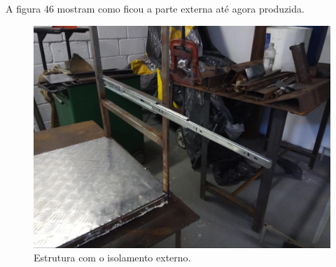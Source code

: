 A figura 46 mostram como ficou a parte externa até agora produzida.

\begin{figure}[H]
	\centering
	\includegraphics[width=12cm]{figuras/resultado_3.jpg}
	\caption{Estrutura com o isolamento externo.} \label{resultado_3}
\end{figure}